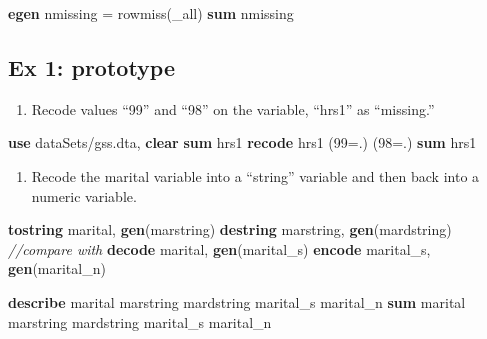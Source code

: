 \documentclass[]{book}
\newenvironment{Shaded}{\begin{snugshade}}{\end{snugshade}}
\newcommand{\CommentTok}[1]{\textcolor[rgb]{0.56,0.35,0.01}{\textit{#1}}}
\newcommand{\DataTypeTok}[1]{\textcolor[rgb]{0.13,0.29,0.53}{#1}}
\newcommand{\FunctionTok}[1]{\textcolor[rgb]{0.00,0.00,0.00}{#1}}
\newcommand{\KeywordTok}[1]{\textcolor[rgb]{0.13,0.29,0.53}{\textbf{#1}}}
\newcommand{\NormalTok}[1]{#1}
\providecommand{\tightlist}{%
  \setlength{\itemsep}{0pt}\setlength{\parskip}{0pt}}
\begin{document}
\begin{Shaded}
\begin{Highlighting}[]
  \KeywordTok{egen}\NormalTok{ nmissing = }\FunctionTok{rowmiss}\NormalTok{(}\DataTypeTok{_all}\NormalTok{)}
  \KeywordTok{sum}\NormalTok{ nmissing}
\end{Highlighting}
\end{Shaded}

\hypertarget{ex-1-prototype-7}{%
\subsection{Ex 1: prototype}\label{ex-1-prototype-7}}

\begin{enumerate}
\def\labelenumi{\arabic{enumi}.}
\tightlist
\item
  Recode values ``99'' and ``98'' on the variable, ``hrs1'' as ``missing.''
\end{enumerate}

\begin{Shaded}
\begin{Highlighting}[]
  \KeywordTok{use}\NormalTok{ dataSets/gss.dta, }\KeywordTok{clear}
  \KeywordTok{sum}\NormalTok{ hrs1}
  \KeywordTok{recode}\NormalTok{ hrs1 (99=.) (98=.) }
  \KeywordTok{sum}\NormalTok{ hrs1}
\end{Highlighting}
\end{Shaded}

\begin{enumerate}
\def\labelenumi{\arabic{enumi}.}
\setcounter{enumi}{1}
\tightlist
\item
  Recode the marital variable into a ``string'' variable and then back into a numeric variable.
\end{enumerate}

\begin{Shaded}
\begin{Highlighting}[]
  \KeywordTok{tostring}\NormalTok{ marital, }\KeywordTok{gen}\NormalTok{(marstring)}
  \KeywordTok{destring}\NormalTok{ marstring, }\KeywordTok{gen}\NormalTok{(mardstring)}
  \CommentTok{//compare with}
  \KeywordTok{decode}\NormalTok{ marital, }\KeywordTok{gen}\NormalTok{(marital_s)}
  \KeywordTok{encode}\NormalTok{ marital_s, }\KeywordTok{gen}\NormalTok{(marital_n)}

  \KeywordTok{describe}\NormalTok{ marital marstring mardstring marital_s marital_n}
  \KeywordTok{sum}\NormalTok{ marital marstring mardstring marital_s marital_n}
\end{Highlighting}
\end{Shaded}
\end{document}
